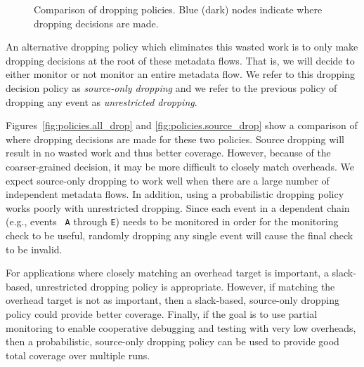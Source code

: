 \begin{figure}
\begin{center}
{    \label{fig:policies.source_drop}
  }
  \vspace{-0.1in}
  \end{center}
  \vspace{-0.1in}
  \caption{Comparison of dropping policies. Blue (dark) nodes indicate where
  dropping decisions are made.}
  \label{fig:policies.policies}
\end{figure}

An alternative dropping policy which eliminates this wasted work is to only make dropping decisions at
the root of these metadata flows. That is, we will decide to either monitor or
not monitor an entire metadata flow. We refer to this dropping decision policy
as \emph{source-only dropping} and we refer to the previous policy of 
dropping any event as \emph{unrestricted dropping}.

Figures~\ref{fig:policies.all_drop} and \ref{fig:policies.source_drop} show a
comparison of where dropping decisions are made for these two policies. Source
dropping will
result in no wasted work and thus better coverage. However, because of the coarser-grained decision, it
may be more difficult to closely match overheads. We expect source-only dropping 
to work well when there are a large number of independent metadata flows.
In addition, using a probabilistic dropping policy works poorly with
unrestricted dropping. Since each event in a dependent chain (e.g., events {\tt
A} through {\tt E}) needs to be monitored in order for the monitoring check to
be useful, randomly dropping any single event will cause the final check to be
invalid.

For applications where closely matching an overhead target is important, a
slack-based, unrestricted dropping policy is appropriate. However, if matching
the overhead target is not as important, then a slack-based, source-only dropping
policy could provide better coverage. 
Finally, if the goal is to use partial monitoring to enable cooperative
debugging and testing with very low overheads, then a probabilistic,
source-only dropping policy can be used to provide good total coverage over
multiple runs.

